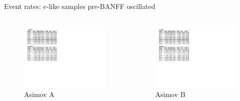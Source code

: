 \documentclass{beamer}
\begin{document}
\begin{frame}{Event rates: $e$-like samples pre-BANFF oscillated}
	\centering

	\begin{columns}
		\begin{column}{0.5\paperwidth}
			\begin{figure}
				\includegraphics[page=2, trim={0cm 8cm 13cm 1cm}, clip, scale=0.52] {images/rates/prefit_A}
				\caption*{Asimov A}
			\end{figure}
		\end{column}
		\begin{column}{0.5\paperwidth}
			\begin{figure}
				\includegraphics[page=2, trim={0cm 8cm 13cm 1cm}, clip, scale=0.52] {images/rates/prefit_B}
				\caption*{Asimov B}
			\end{figure}
		\end{column}
	\end{columns}
\end{frame}
\end{document}
